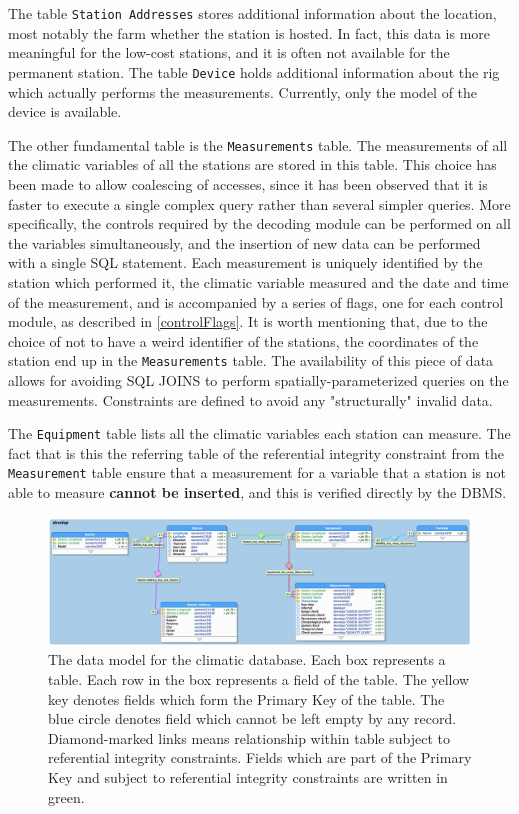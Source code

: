 \documentclass[authoryear,preprint,review,12pt]{elsarticle}
\begin{document}
The table \texttt{Station Addresses} stores additional information about the location, most notably the farm whether the station is hosted. In fact, this data is more meaningful for the low-cost stations, and it is often not available for the permanent station. The table \texttt{Device} holds additional information about the rig which actually performs the measurements. Currently, only the model of the device is available.

The other fundamental table is the \texttt{Measurements} table. The measurements of all the climatic variables of all the stations are stored in this table. This choice has been made to allow coalescing of accesses, since it has been observed that it is faster to execute a single complex query rather than several simpler queries. More specifically, the controls required by the decoding module can be performed on all the variables simultaneously, and the insertion of new data can be performed with a single SQL statement. Each measurement is uniquely identified by the station which performed it, the climatic variable measured and the date and time of the measurement, and is accompanied by a series of flags, one for each control module, as described in \cref{controlFlags}. It is worth mentioning that, due to the choice of not to have a weird identifier of the stations, the coordinates of the station end up in the \texttt{Measurements} table. The availability of this piece of data allows for avoiding SQL JOINS to perform spatially-parameterized queries on the measurements. Constraints are defined to avoid any "structurally" invalid data.

The \texttt{Equipment} table lists all the climatic variables each station can measure. The fact that is this the referring table of the referential integrity constraint from the \texttt{Measurement} table ensure that a measurement for a variable that a station is not able to measure \textbf{cannot be inserted}, and this is verified directly by the DBMS.

\begin{figure}
	\includegraphics[scale=.26]{ERD}
	\caption{The data model for the climatic database. Each box represents a table. Each row in the box represents a field of the table. The yellow key denotes fields which form the Primary Key of the table. The blue circle denotes field which cannot be left empty by any record. Diamond-marked links means relationship within table subject to referential integrity constraints. Fields which are part of the Primary Key and subject to referential integrity constraints are written in green.}
	\label{ERD}
\end{figure}
\end{document}
